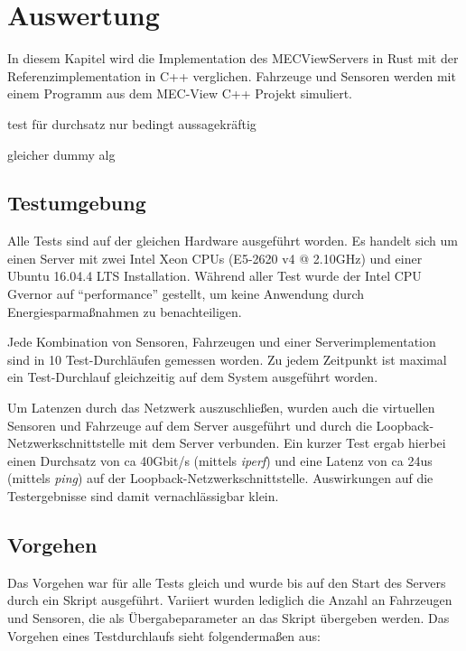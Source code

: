 
			
\chapter{Auswertung}

In diesem Kapitel wird die Implementation des MECViewServers in Rust mit der Referenzimplementation in C++ verglichen.
Fahrzeuge und Sensoren werden mit einem Programm aus dem MEC-View C++ Projekt simuliert.

test für durchsatz nur bedingt aussagekräftig

gleicher dummy alg

\section{Testumgebung}

Alle Tests sind auf der gleichen Hardware ausgeführt worden.
Es handelt sich um einen Server mit zwei Intel Xeon CPUs (E5-2620 v4 @ 2.10GHz) und einer Ubuntu 16.04.4 LTS Installation.
Während aller Test wurde der Intel CPU Gvernor auf \enquote{performance} gestellt, um keine Anwendung durch Energiesparmaßnahmen zu benachteiligen.

Jede Kombination von Sensoren, Fahrzeugen und einer Serverimplementation sind in 10 Test-Durchläufen gemessen worden.
Zu jedem Zeitpunkt ist maximal ein Test-Durchlauf gleichzeitig auf dem System ausgeführt worden.

Um Latenzen durch das Netzwerk auszuschließen, wurden auch die virtuellen Sensoren und Fahrzeuge auf dem Server ausgeführt und durch die Loopback-Netzwerkschnittstelle mit dem Server verbunden.
Ein kurzer Test ergab hierbei einen Durchsatz von ca 40Gbit/s (mittels \textit{iperf}) und eine Latenz von ca 24us (mittels \textit{ping}) auf der Loopback-Netzwerkschnittstelle.
Auswirkungen auf die Testergebnisse sind damit vernachlässigbar klein.



\section{Vorgehen}

Das Vorgehen war für alle Tests gleich und wurde bis auf den Start des Servers durch ein Skript ausgeführt.
Variiert wurden lediglich die Anzahl an Fahrzeugen und Sensoren, die als Übergabeparameter an das Skript übergeben werden.
Das Vorgehen eines Testdurchlaufs sieht folgendermaßen aus:

